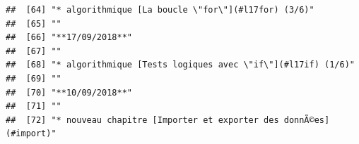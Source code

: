 \documentclass[]{book}
\begin{document}
\begin{verbatim}
##  [64] "* algorithmique [La boucle \"for\"](#l17for) (3/6)"                                                                                                                                                                                                                                                         
##  [65] ""                                                                                                                                                                                                                                                                                                           
##  [66] "**17/09/2018**"                                                                                                                                                                                                                                                                                             
##  [67] ""                                                                                                                                                                                                                                                                                                           
##  [68] "* algorithmique [Tests logiques avec \"if\"](#l17if) (1/6)"                                                                                                                                                                                                                                                 
##  [69] ""                                                                                                                                                                                                                                                                                                           
##  [70] "**10/09/2018**"                                                                                                                                                                                                                                                                                             
##  [71] ""                                                                                                                                                                                                                                                                                                           
##  [72] "* nouveau chapitre [Importer et exporter des donnÃ©es](#import)"                                                                                                                                                                                                                                            

\end{verbatim}
\end{document}
